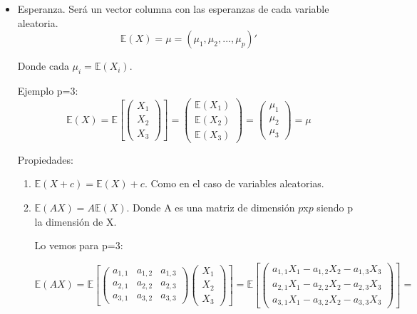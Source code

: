\documentclass[palatino,nochap]{apuntes}
\begin{document}
\begin{itemize}
\item Esperanza. Será un vector columna con las esperanzas de cada variable aleatoria.
\[
\mathbb{E}(X) = \mu = (\mu_1, \mu_2,..., \mu_p)'
\]

Donde cada $\mu_i = \mathbb{E}(X_i)$.

Ejemplo p=3:
\[
\mathbb{E}(X)=
\mathbb{E}\left[
\left(
\begin{array}{c}
X_1\\
X_2\\
X_3
\end{array}
\right)
\right]=
\left(
\begin{array}{c}
\mathbb{E}(X_1)\\
\mathbb{E}(X_2)\\
\mathbb{E}(X_3)
\end{array}
\right)=
\left(
\begin{array}{c}
\mu_1\\
\mu_2\\
\mu_3
\end{array}
\right)=
\mu
\]

Propiedades:
\begin{enumerate}
\item $\mathbb{E}(X+c) = \mathbb{E}(X)+c$. Como en el caso de variables aleatorias.
\item $\mathbb{E}(AX) = A\mathbb{E}(X)$. Donde A es una matriz de dimensión $p$x$p$ siendo p la dimensión de X.

Lo vemos para p=3:

\[
\mathbb{E}(AX)=
\mathbb{E}\left[
\left(
\begin{array}{ccc}
a_{1,1}& a_{1,2}& a_{1,3}\\
a_{2,1}& a_{2,2}& a_{2,3}\\
a_{3,1}& a_{3,2}& a_{3,3}
\end{array}
\right)
\left(
\begin{array}{c}
X_1\\
X_2\\
X_3
\end{array}
\right) \right]=
\mathbb{E}\left[
\left(
\begin{array}{c}
a_{1,1}X_1 - a_{1,2}X_2 - a_{1,3}X_3\\
a_{2,1}X_1 - a_{2,2}X_2 - a_{2,3}X_3\\
a_{3,1}X_1 - a_{3,2}X_2 - a_{3,3}X_3
\end{array}
\right)
\right]=
\]


\end{enumerate}
\end{itemize}
\end{document}
